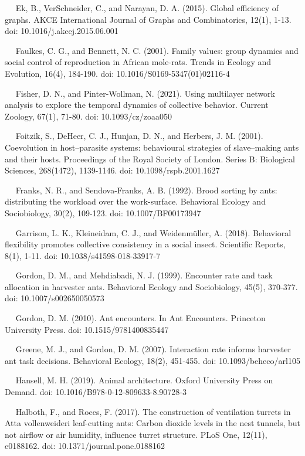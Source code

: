 \documentclass[3p]{elsarticle} %
\begin{document}
~~ Ek, B., VerSchneider, C., and Narayan, D. A. (2015). Global
efficiency of graphs. AKCE International Journal of Graphs and
Combinatorics, 12(1), 1-13. doi: 10.1016/j.akcej.2015.06.001

~~ Faulkes, C. G., and Bennett, N. C. (2001). Family values: group
dynamics and social control of reproduction in African mole-rats. Trends
in Ecology and Evolution, 16(4), 184-190. doi:
10.1016/S0169-5347(01)02116-4

~~ Fisher, D. N., and Pinter-Wollman, N. (2021). Using multilayer
network analysis to explore the temporal dynamics of collective
behavior. Current Zoology, 67(1), 71-80. doi: 10.1093/cz/zoaa050

~~ Foitzik, S., DeHeer, C. J., Hunjan, D. N., and Herbers, J. M. (2001).
Coevolution in host--parasite systems: behavioural strategies of
slave--making ants and their hosts. Proceedings of the Royal Society of
London. Series B: Biological Sciences, 268(1472), 1139-1146. doi:
10.1098/rspb.2001.1627

~~ Franks, N. R., and Sendova-Franks, A. B. (1992). Brood sorting by
ants: distributing the workload over the work-surface. Behavioral
Ecology and Sociobiology, 30(2), 109-123. doi: 10.1007/BF00173947

~~ Garrison, L. K., Kleineidam, C. J., and Weidenmüller, A. (2018).
Behavioral flexibility promotes collective consistency in a social
insect. Scientific Reports, 8(1), 1-11. doi: 10.1038/s41598-018-33917-7

~~ Gordon, D. M., and Mehdiabadi, N. J. (1999). Encounter rate and task
allocation in harvester ants. Behavioral Ecology and Sociobiology,
45(5), 370-377. doi: 10.1007/s002650050573

~~ Gordon, D. M. (2010). Ant encounters. In Ant Encounters. Princeton
University Press. doi: 10.1515/9781400835447

~~ Greene, M. J., and Gordon, D. M. (2007). Interaction rate informs
harvester ant task decisions. Behavioral Ecology, 18(2), 451-455. doi:
10.1093/beheco/arl105

~~ Hansell, M. H. (2019). Animal architecture. Oxford University Press
on Demand. doi: 10.1016/B978-0-12-809633-8.90728-3

~~ Halboth, F., and Roces, F. (2017). The construction of ventilation
turrets in Atta vollenweideri leaf-cutting ants: Carbon dioxide levels
in the nest tunnels, but not airflow or air humidity, influence turret
structure. PLoS One, 12(11), e0188162. doi: 10.1371/journal.pone.0188162
\end{document}
